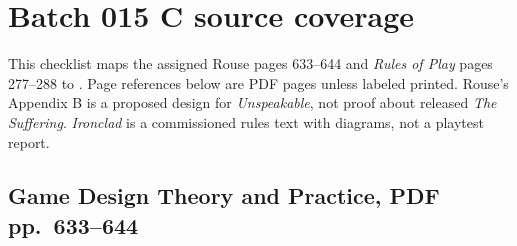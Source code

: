 \section{Batch 015 C source coverage}\label{appendix-877738f6f4d2-batch-015-c-source-coverage}

\hypertarget{appendix-877738f6f4d2-batch-015-c-source-coverage}{}

This checklist maps the assigned Rouse pages 633--644 and \emph{Rules of Play} pages 277--288 to . Page references below are PDF pages unless labeled printed. Rouse's Appendix B is a proposed design for \emph{Unspeakable}, not proof about released \emph{The Suffering}. \emph{Ironclad} is a commissioned rules text with diagrams, not a playtest report.

\subsection{Game Design Theory and Practice, PDF pp.~633--644}\label{appendix-877738f6f4d2-game-design-theory-and-practice-pdf-pp.-633644}

\hypertarget{appendix-877738f6f4d2-game-design-theory-and-practice-pdf-pp.-633644}{}

